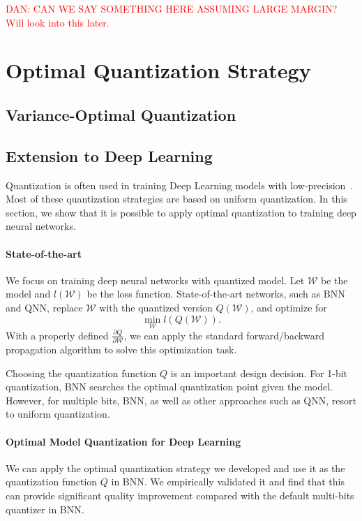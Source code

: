 \documentclass{article}
\begin{document}
\textcolor{red}{DAN: CAN WE SAY SOMETHING HERE ASSUMING LARGE MARGIN?}
\textcolor{red}{Will look into this later.}

\section{Optimal Quantization Strategy}

\subsection{Variance-Optimal Quantization}



\subsection{Extension to Deep Learning}

Quantization is often used in training 
Deep Learning models with low-precision~\cite{XXX,XXX}.
Most of these quantization strategies
are based on uniform quantization. In this
section, we show that it is possible to
apply optimal quantization to
training deep neural networks.

\paragraph*{State-of-the-art} We focus on
training deep neural networks with quantized
model. Let $\mathcal{W}$ be the model and 
$l(\mathcal{W})$ be the loss function. State-of-the-art networks,
such as BNN and QNN, replace $\mathcal{W}$
with the quantized version $Q(\mathcal{W})$, and optimize
for
\[
\min_{\mathcal{W}} l(Q(\mathcal{W})).
\]
With a properly defined 
$\frac{\partial Q}{\partial{\mathcal{W}}}$, we can
apply the standard forward/backward propagation 
algorithm to solve this optimization task.

Choosing the quantization function $Q$ is
an important design decision. For 1-bit quantization,
BNN searches the optimal quantization point given
the model. However, for multiple bits,
BNN, as well as other approaches such as QNN, resort
to uniform quantization.

\paragraph*{Optimal Model Quantization for Deep Learning}

We can apply the optimal quantization strategy we
developed and use it as the quantization function $Q$
in BNN. We empirically validated it 
and find that this can provide significant quality improvement
compared with the default multi-bits quantizer in BNN. 
\end{document}
